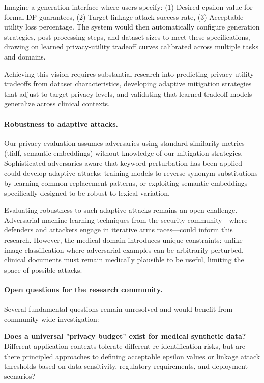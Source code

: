 Imagine a generation interface where users specify: (1) Desired epsilon value for formal DP guarantees, (2) Target linkage attack success rate, (3) Acceptable utility loss percentage.
The system would then automatically configure generation strategies, post-processing steps, and dataset sizes to meet these specifications, drawing on learned privacy-utility tradeoff curves calibrated across multiple tasks and domains.

Achieving this vision requires substantial research into predicting privacy-utility tradeoffs from dataset characteristics, developing adaptive mitigation strategies that adjust to target privacy levels, and validating that learned tradeoff models generalize across clinical contexts.

\paragraph{Robustness to adaptive attacks.}

Our privacy evaluation assumes adversaries using standard similarity metrics (\gls{tfidf}, semantic embeddings) without knowledge of our mitigation strategies.
Sophisticated adversaries aware that keyword perturbation has been applied could develop adaptive attacks: training models to reverse synonym substitutions by learning common replacement patterns, or exploiting semantic embeddings specifically designed to be robust to lexical variation.

Evaluating robustness to such adaptive attacks remains an open challenge.
Adversarial machine learning techniques from the security community—where defenders and attackers engage in iterative arms races—could inform this research.
However, the medical domain introduces unique constraints: unlike image classification where adversarial examples can be arbitrarily perturbed, clinical documents must remain medically plausible to be useful, limiting the space of possible attacks.

\paragraph{Open questions for the research community.}

Several fundamental questions remain unresolved and would benefit from community-wide investigation:

\textbf{Does a universal "privacy budget" exist for medical synthetic data?}
Different application contexts tolerate different re-identification risks, but are there principled approaches to defining acceptable epsilon values or linkage attack thresholds based on data sensitivity, regulatory requirements, and deployment scenarios?

